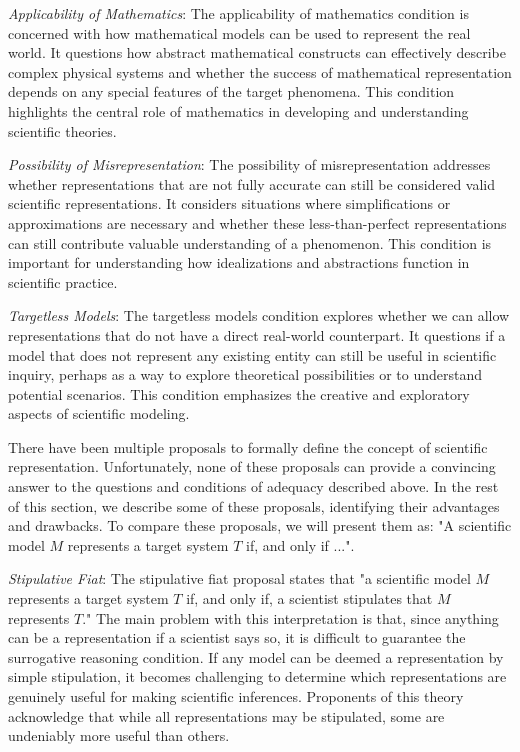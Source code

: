 \emph{Applicability of Mathematics}: The applicability of mathematics condition is concerned with how mathematical models can be used to represent the real world. It questions how abstract mathematical constructs can effectively describe complex physical systems and whether the success of mathematical representation depends on any special features of the target phenomena. This condition highlights the central role of mathematics in developing and understanding scientific theories.

\emph{Possibility of Misrepresentation}: The possibility of misrepresentation addresses whether representations that are not fully accurate can still be considered valid scientific representations. It considers situations where simplifications or approximations are necessary and whether these less-than-perfect representations can still contribute valuable understanding of a phenomenon. This condition is important for understanding how idealizations and abstractions function in scientific practice.

\emph{Targetless Models}: The targetless models condition explores whether we can allow representations that do not have a direct real-world counterpart. It questions if a model that does not represent any existing entity can still be useful in scientific inquiry, perhaps as a way to explore theoretical possibilities or to understand potential scenarios. This condition emphasizes the creative and exploratory aspects of scientific modeling.

There have been multiple proposals to formally define the concept of scientific representation. Unfortunately, none of these proposals can provide a convincing answer to the questions and conditions of adequacy described above. In the rest of this section, we describe some of these proposals, identifying their advantages and drawbacks. To compare these proposals, we will present them as: "A scientific model $M$ represents a target system $T$ if, and only if ...".

\emph{Stipulative Fiat}: The stipulative fiat proposal states that "a scientific model $M$ represents a target system $T$ if, and only if, a scientist stipulates that $M$ represents $T$." The main problem with this interpretation is that, since anything can be a representation if a scientist says so, it is difficult to guarantee the surrogative reasoning condition. If any model can be deemed a representation by simple stipulation, it becomes challenging to determine which representations are genuinely useful for making scientific inferences. Proponents of this theory acknowledge that while all representations may be stipulated, some are undeniably more useful than others.

